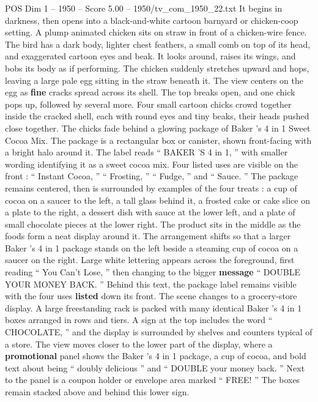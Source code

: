 \begin{textsample}{POS Dim 1 – 1950 – Score 5.00 – 1950/tv\_com\_1950\_22.txt}  \label{ex:f1_pos_085}
It begins in darkness, then opens into a black-and-white cartoon barnyard or chicken-coop setting.
A plump animated chicken sits on straw in front of a chicken-wire fence.
The bird has a dark body, lighter chest feathers, a small comb on top of its head, and exaggerated cartoon eyes and beak.
It looks around, raises its wings, and bobs its body as if performing.
The chicken suddenly stretches upward and hops, leaving a large pale egg sitting in the straw beneath it.
The view centers on the egg as \textbf{fine} cracks spread across its shell.
The top breaks open, and one chick pops up, followed by several more.
Four small cartoon chicks crowd together inside the cracked shell, each with round eyes and tiny beaks, their heads pushed close together.
The chicks fade behind a glowing package of Baker ’s 4 in 1 Sweet Cocoa Mix.
The package is a rectangular box or canister, shown front-facing with a bright halo around it.
The label reads “ BAKER ’S 4 in 1, ” with smaller wording identifying it as a sweet cocoa mix.
Four listed uses are visible on the front : “ Instant Cocoa, ” “ Frosting, ” “ Fudge, ” and “ Sauce. ” The package remains centered, then is surrounded by examples of the four treats : a cup of cocoa on a saucer to the left, a tall glass behind it, a frosted cake or cake slice on a plate to the right, a dessert dish with sauce at the lower left, and a plate of small chocolate pieces at the lower right.
The product sits in the middle as the foods form a neat display around it.
The arrangement shifts so that a larger Baker ’s 4 in 1 package stands on the left beside a steaming cup of cocoa on a saucer on the right.
Large white lettering appears across the foreground, first reading “ You Can't Lose, ” then changing to the bigger \textbf{message} “ DOUBLE YOUR MONEY BACK. ” Behind this text, the package label remains visible with the four uses \textbf{listed} down its front.
The scene changes to a grocery-store display.
A large freestanding rack is packed with many identical Baker ’s 4 in 1 boxes arranged in rows and tiers.
A sign at the top includes the word “ CHOCOLATE, ” and the display is surrounded by shelves and counters typical of a store.
The view moves closer to the lower part of the display, where a \textbf{promotional} panel shows the Baker ’s 4 in 1 package, a cup of cocoa, and bold text about being “ doubly delicious ” and “ DOUBLE your money back. ” Next to the panel is a coupon holder or envelope area marked “ FREE! ” The boxes remain stacked above and behind this lower sign.

\end{textsample}
